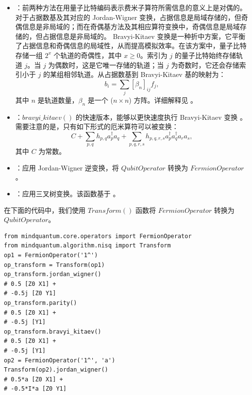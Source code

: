 \begin{itemize}
\begin{equation}
\begin{cases}
                  0 & i\geq j \\
              \end{cases}.
          \end{equation}
          因而，产生算符和湮灭算符在奇偶基中的表示为：
          \begin{equation}
              \begin{split}
                  a_j^{\dagger} \to \frac{1}{2} (\prod_{i=j+1}^n ({\sigma}^X_i X))({\sigma}^X_j - i{\sigma}^Y_j) X {\sigma}^Z_{j-1} \\
                  a_j \to \frac{1}{2} (\prod_{i=j+1}^n ({\sigma}^X_i X))({\sigma}^X_j + i{\sigma}^Y_j) X {\sigma}^Z_{j-1}.
              \end{split}
          \end{equation}
    \item \methodbravyikitaev \cite{bravyi2002fermionic, fenwick1994new}：前两种方法在用量子比特编码表示费米子算符所需信息的意义上是对偶的。对于占据数基及其对应的 Jordan-Wigner 变换，占据信息是局域存储的，但奇偶信息是非局域的；而在奇偶基方法及其相应算符变换中，奇偶信息是局域存储的，但占据信息是非局域的。
          Bravyi-Kitaev 变换是一种折中方案，它平衡了占据信息和奇偶信息的局域性，从而提高模拟效率。在该方案中，量子比特存储一组 $2^x$ 个轨道的奇偶性，其中 $x \geq 0$。索引为 $j$ 的量子比特始终存储轨道 $j$。当 $j$ 为偶数时，这是它唯一存储的轨道；当 $j$ 为奇数时，它还会存储索引小于 $j$ 的某组相邻轨道。从占据数基到 Bravyi-Kitaev 基的映射为：
          \begin{equation}
              b_i = \sum_j {[\beta_n]_{ij} f_j},
          \end{equation}
          其中 $n$ 是轨道数量，$\beta_n$ 是一个 ($n \times n$) 方阵。详细解释见 \cite{seeley2012bravyi}。
    \item \methodbravyikitaevsuperfast：$bravyi\_kitaev()$ 的快速版本，能够以更快速度执行 Bravyi-Kitaev 变换 \cite{setia2018bravyi}。需要注意的是，只有如下形式的厄米算符可以被变换：
          \begin{equation}
              C + \sum_{p,q} h_{p,q} a_p^{\dagger} a_q + \sum_{p,q,r,s} h_{p,q,r,s} a_p^{\dagger} a_q^{\dagger} a_r a_s,
          \end{equation}
          其中 $C$ 为常数。
    \item \methodreversedjordanwigner：应用 Jordan-Wigner 逆变换，将 $QubitOperator$ 转换为 $FermionOperator$。
    \item \methodternarytree：应用三叉树变换。该函数基于 \cite{jiang2020optimal}。
\end{itemize}
在下面的代码中，我们使用 $Transform()$ 函数将 $FermionOperator$ 转换为 $QubitOperator$。
\begin{lstlisting}
from mindquantum.core.operators import FermionOperator
from mindquantum.algorithm.nisq import Transform
op1 = FermionOperator('1^')
op_transform = Transform(op1)
op_transform.jordan_wigner()
# 0.5 [Z0 X1] +
# -0.5j [Z0 Y1]
op_transform.parity()
# 0.5 [Z0 X1] +
# -0.5j [Y1]
op_transform.bravyi_kitaev()
# 0.5 [Z0 X1] +
# -0.5j [Y1]
op2 = FermionOperator('1^', 'a')
Transform(op2).jordan_wigner()
# 0.5*a [Z0 X1] +
# -0.5*I*a [Z0 Y1]
\end{lstlisting}
